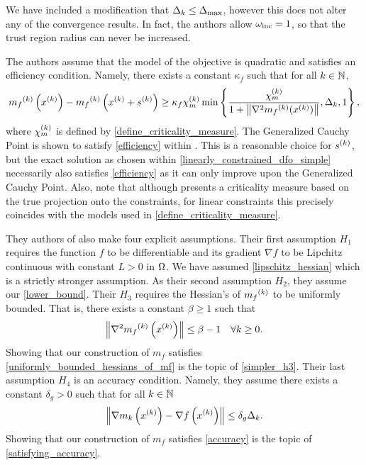 We have included a modification that $\Delta_k \le {\Delta_{\textrm{max}}}$, however this does not alter any of the convergence results.
In fact, the authors allow $\omega_{\text{inc}} = 1$, so that the trust region radius can never be increased.

The authors assume that the model of the objective is quadratic and satisfies an efficiency condition.
Namely, there exists a constant $\kappa_f$ such that for all $k \in \mathbb N$,
\begin{align}
\label{efficiency}
{{m}_f}^{(k)}\left(x^{(k)}\right) - {{m}_f}^{(k)}\left(x^{(k)} + {{s}^{(k)}}\right) \ge \kappa_f {\chi_m^{(k)}} \min\left\{ \frac{{\chi_m^{(k)}}}{1+\left\|\nabla^2 {{m}_f}^{(k)}(x^{(k)})\right\|}, \Delta_k, 1 \right\},
\end{align}
where ${\chi_m^{(k)}}$ is defined by \cref{define_criticality_measure}.
The Generalized Cauchy Point is shown to satisfy \cref{efficiency} within \cite{Conn:2000:TM:357813}.
This is a reasonable choice for ${{s}^{(k)}}$, but the exact solution as chosen within \cref{linearly_constrained_dfo_simple} 
necessarily also satisfies \cref{efficiency} as it can only improve upon the Generalized Cauchy Point.
Also, note that although \cite{Conejo:2013:GCT:2620806.2621814} presents a criticality measure based on the true projection onto the constraints,
for linear constraints this precisely coincides with the models used in \cref{define_criticality_measure}.

They authors of \cite{Conejo:2013:GCT:2620806.2621814} also make four explicit assumptions.
Their first assumption $H_1$ requires the function $f$ to be differentiable and its gradient $\nabla f$ to be Lipchitz continuous with constant $L > 0$ in $\Omega$.
We have assumed \cref{lipschitz_hessian} which is a strictly stronger assumption.
As their second assumption $H_2$, they assume our \cref{lower_bound}.
Their $H_3$ requires the Hessian's of ${{m}_f}^{(k)}$ to be uniformly bounded.
That is, there exists a constant $\beta \ge 1$ such that
\begin{align}
\label{uniformly_bounded_hessians_of_mf}
\left\|\nabla^2 {{m}_f}^{(k)}\left(x^{(k)}\right)\right\| \le \beta - 1\quad \forall k \ge 0.
\end{align}
Showing that our construction of $m_f$ satisfies \cref{uniformly_bounded_hessians_of_mf} is the topic of \cref{simpler_h3}.
Their last assumption $H_4$ is an accuracy condition.
Namely, they assume there exists a constant $\delta_g>0$ such that for all $k \in \mathbb N$
\begin{align}
\label{accuracy}
\left\|\nabla m_k\left(x^{(k)}\right) - \nabla f\left(x^{(k)}\right)\right\| \le \delta_g \Delta_k.
\end{align}
Showing that our construction of $m_f$ satisfies \cref{accuracy} is the topic of \cref{satisfying_accuracy}.

